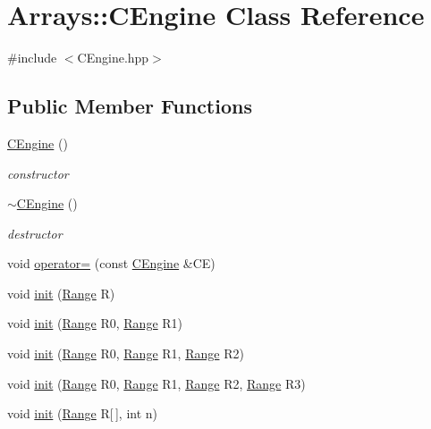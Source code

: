 \hypertarget{classArrays_1_1CEngine}{}\section{Arrays\+:\+:C\+Engine Class Reference}
\label{classArrays_1_1CEngine}


{\ttfamily \#include $<$C\+Engine.\+hpp$>$}

\subsection*{Public Member Functions}
\begin{DoxyCompactItemize}
\item 
\hyperlink{classArrays_1_1CEngine_a01d1f0e01c533769e5c8e977de29526a}{C\+Engine} ()
\begin{DoxyCompactList}\small\item\em constructor \end{DoxyCompactList}\item 
\hyperlink{classArrays_1_1CEngine_a0a880a3d41c4c32923dc94dc73161b02}{$\sim$\+C\+Engine} ()
\begin{DoxyCompactList}\small\item\em destructor \end{DoxyCompactList}\item 
void \hyperlink{classArrays_1_1CEngine_a8bc9c235f36d0853920d35ec7be85926}{operator=} (const \hyperlink{classArrays_1_1CEngine}{C\+Engine} \&C\+E)
\item 
void \hyperlink{classArrays_1_1CEngine_a822d9ad06760dd1f2f12959b6711a9c8}{init} (\hyperlink{structArrays_1_1Range}{Range} R)
\item 
void \hyperlink{classArrays_1_1CEngine_a1057ecdd47f822e255cd18a343167fae}{init} (\hyperlink{structArrays_1_1Range}{Range} R0, \hyperlink{structArrays_1_1Range}{Range} R1)
\item 
void \hyperlink{classArrays_1_1CEngine_ad7137577cd28ee23e59674acdad505ec}{init} (\hyperlink{structArrays_1_1Range}{Range} R0, \hyperlink{structArrays_1_1Range}{Range} R1, \hyperlink{structArrays_1_1Range}{Range} R2)
\item 
void \hyperlink{classArrays_1_1CEngine_ade8136a7bfea28586e3a485e4b5877cb}{init} (\hyperlink{structArrays_1_1Range}{Range} R0, \hyperlink{structArrays_1_1Range}{Range} R1, \hyperlink{structArrays_1_1Range}{Range} R2, \hyperlink{structArrays_1_1Range}{Range} R3)
\item 
void \hyperlink{classArrays_1_1CEngine_a33328a1e3089fda721c53cacb9b9aa59}{init} (\hyperlink{structArrays_1_1Range}{Range} R\mbox{[}$\,$\mbox{]}, int n)

\end{DoxyCompactItemize}
